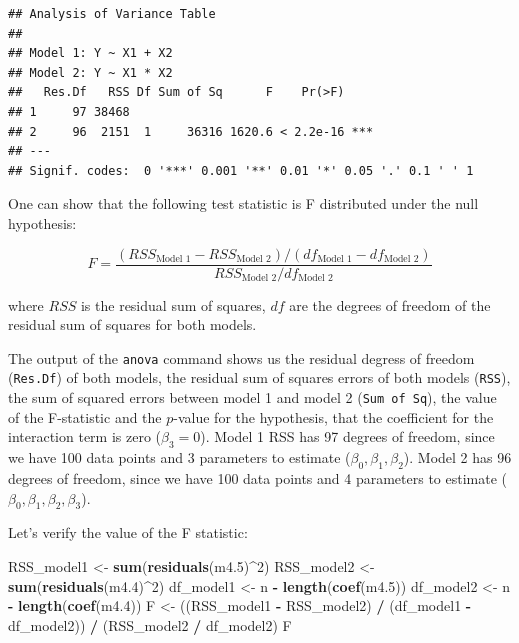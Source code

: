 \documentclass[
]{book}
\newenvironment{Shaded}{\begin{snugshade}}{\end{snugshade}}
\newcommand{\DecValTok}[1]{\textcolor[rgb]{0.00,0.00,0.81}{#1}}
\newcommand{\FloatTok}[1]{\textcolor[rgb]{0.00,0.00,0.81}{#1}}
\newcommand{\FunctionTok}[1]{\textcolor[rgb]{0.13,0.29,0.53}{\textbf{#1}}}
\newcommand{\NormalTok}[1]{#1}
\newcommand{\OtherTok}[1]{\textcolor[rgb]{0.56,0.35,0.01}{#1}}
\newcommand{\SpecialCharTok}[1]{\textcolor[rgb]{0.81,0.36,0.00}{\textbf{#1}}}
\begin{document}
\begin{verbatim}
## Analysis of Variance Table
## 
## Model 1: Y ~ X1 + X2
## Model 2: Y ~ X1 * X2
##   Res.Df   RSS Df Sum of Sq      F    Pr(>F)    
## 1     97 38468                                  
## 2     96  2151  1     36316 1620.6 < 2.2e-16 ***
## ---
## Signif. codes:  0 '***' 0.001 '**' 0.01 '*' 0.05 '.' 0.1 ' ' 1
\end{verbatim}

One can show that the following test statistic is F distributed under the null hypothesis:

\[ F = \frac{\left(RSS_{\text{Model 1}} - RSS_{\text{Model 2}}\right) / \left(df_{\text{Model 1}} - df_{\text{Model 2}}\right)}{RSS_{\text{Model 2}} / df_{\text{Model 2}}}\]

where \(RSS\) is the residual sum of squares,
\(df\) are the degrees of freedom of the residual sum of squares for both models.

The output of the \texttt{anova} command shows us the residual degress of freedom (\texttt{Res.Df})
of both models, the residual sum of squares errors of both models (\texttt{RSS}),
the sum of squared errors between model 1 and model 2 (\texttt{Sum\ of\ Sq}), the value of the
F-statistic and the \(p\)-value for the hypothesis, that the coefficient for
the interaction term is zero (\(\beta_3=0\)). Model 1 RSS has 97 degrees of freedom, since we have 100 data points
and 3 parameters to estimate (\(\beta_0, \beta_1, \beta_2\)). Model 2 has 96 degrees of freedom, since
we have 100 data points and 4 parameters to estimate (\(\beta_0, \beta_1, \beta_2, \beta_3\)).

Let's verify the value of the F statistic:

\begin{Shaded}
\begin{Highlighting}[]
\NormalTok{RSS\_model1 }\OtherTok{\textless{}{-}} \FunctionTok{sum}\NormalTok{(}\FunctionTok{residuals}\NormalTok{(m4}\FloatTok{.5}\NormalTok{)}\SpecialCharTok{\^{}}\DecValTok{2}\NormalTok{)}
\NormalTok{RSS\_model2 }\OtherTok{\textless{}{-}} \FunctionTok{sum}\NormalTok{(}\FunctionTok{residuals}\NormalTok{(m4}\FloatTok{.4}\NormalTok{)}\SpecialCharTok{\^{}}\DecValTok{2}\NormalTok{)}
\NormalTok{df\_model1 }\OtherTok{\textless{}{-}}\NormalTok{ n }\SpecialCharTok{{-}} \FunctionTok{length}\NormalTok{(}\FunctionTok{coef}\NormalTok{(m4}\FloatTok{.5}\NormalTok{))}
\NormalTok{df\_model2 }\OtherTok{\textless{}{-}}\NormalTok{ n }\SpecialCharTok{{-}} \FunctionTok{length}\NormalTok{(}\FunctionTok{coef}\NormalTok{(m4}\FloatTok{.4}\NormalTok{))}
\NormalTok{F }\OtherTok{\textless{}{-}}\NormalTok{ ((RSS\_model1 }\SpecialCharTok{{-}}\NormalTok{ RSS\_model2) }\SpecialCharTok{/}\NormalTok{ (df\_model1 }\SpecialCharTok{{-}}\NormalTok{ df\_model2)) }\SpecialCharTok{/}\NormalTok{ (RSS\_model2 }\SpecialCharTok{/}\NormalTok{ df\_model2)}
\NormalTok{F}
\end{Highlighting}
\end{Shaded}
\end{document}
